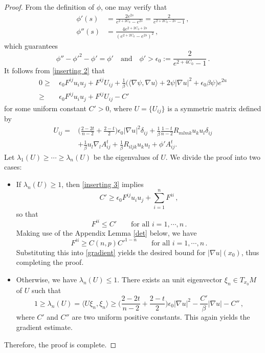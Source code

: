 \documentclass{article}
\theoremstyle{plain}
\theoremstyle{definition}
\theoremstyle{definition}
\numberwithin{equation}{section}
\begin{document}
\begin{sloppypar}
\begin{proof}
From the definition of $\phi$, one may verify that
\[
\begin{split}
\phi'(s)&=\frac{2e^{2s}}{e^{2+2C_0}-e^{2s}}=\frac{2}{e^{2+2C_{0}-2s}-1}\,,\\ 
\phi''(s)&=\frac{4e^{2+2C_{0}+2s}}{(e^{2+2C_0}-e^{2s})^{2}}\,,
\end{split}
\]
which guarantees
\begin{equation*} 
 \phi''-\phi'^2-\phi'=\phi' \quad  \textrm{and}
\quad  \phi'>\epsilon_{0}:=\frac{2}{e^{2+4C_{0}}-1}\,.
\end{equation*}
It follows from \eqref{inserting 2} that
\begin{equation}\label{inserting 3}
\begin{split}
0\geq & \, \epsilon_{0}F^{ij}u_{i}u_{j}+F^{ij}U_{ij}+\frac{1}{\beta}\big(\langle \nabla \psi, \nabla u\rangle +2\psi|\nabla u|^2+\epsilon_{0}\beta \psi\big)e^{2u}\\
\geq & \, \epsilon_{0}F^{ij}u_{i}u_{j}+F^{ij}U_{ij}-C'
\end{split}
\end{equation}
for some uniform constant $C'>0$, where $U=\{U_{ij}\}$ is a symmetric matrix defined by
\[
\begin{split}
U_{ij}=&\Big(\frac{2-2t}{n-2} +\frac{2-t}{2} \Big)\epsilon_{0}|\nabla u|^2\delta_{ij}+\frac{1}{\beta}\frac{1-t}{n-2}R_{mlmk}u_{k}u_{l}\delta_{ij}\\
&+\frac{1}{\beta}u_{l}\nabla_{l}A^{t}_{ij} +\frac{1}{\beta}R_{iljk}u_{k}u_{l}+\phi'A^{t}_{ij}.
\end{split}
\]
Let $\lambda_{1}(U)\geq \cdots \geq \lambda_{n}(U)$ be the eigenvalues of $U$. We divide the proof into two cases:
\begin{itemize}
\item[(i)] If $\lambda_{n}(U)\geq 1$, then \eqref{inserting 3} implies
\begin{equation}\label{gradient}
C'\geq \epsilon_{0}F^{ij}u_{i}u_{j}+\sum_{i=1}^{n}F^{ii}\,,
\end{equation}
so that
\begin{equation*}
F^{ii}\leq C' \qquad \textrm{for all } i=1,\cdots, n\,.
\end{equation*}
Making use of the Appendix Lemma \ref{det}  below, we have
\begin{equation*}
F^{ii}\geq C(n,p)C'^{1-n}  \qquad \textrm{for all } i=1,\cdots, n\,.  
\end{equation*}
Substituting this into \eqref{gradient} yields the desired bound for  $|\nabla u|(x_0)$, thus completing the proof.
\item[(ii)] Otherwise, we have $\lambda_{n}(U)\leq 1$. There exists an unit eigenvector $\xi_{n}\in T_{x_0}M$ of $U$ such that 
\[
1\geq \lambda_{n}(U)=\langle U \xi_{n},\xi_{n}\rangle \geq \Big(\frac{2-2t}{n-2} +\frac{2-t}{2} \Big)\epsilon_{0}|\nabla u|^2-\frac{C'}{\beta}|\nabla u|-C''\,,
\]
where $C'$ and $C''$ are two uniform positive constants. This again yields the gradient estimate.
\end{itemize}
Therefore, the proof is complete.
\end{proof}





\end{sloppypar}
\end{document}
